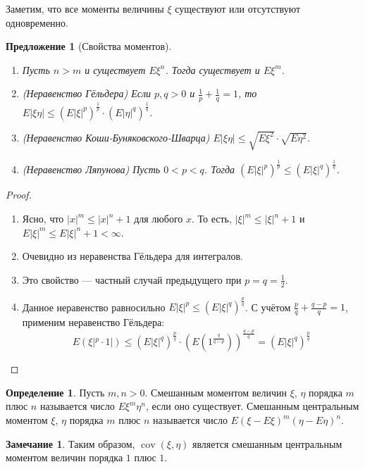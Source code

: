 \documentclass[11pt,openany,a4paper]{scrartcl}
\theoremstyle{plain}
\newtheorem{proposition}[theorem]{Предложение}
\theoremstyle{definition}
\newtheorem{definition}[theorem]{Определение}
\newtheorem{remark}[theorem]{Замечание}
\DeclareMathOperator{\cov}{cov}
\begin{document}
Заметим, что все моменты величины $\xi$ существуют или отсутствуют одновременно.

\begin{proposition}[Свойства моментов]
\mbox{}
    \begin{enumerate}
        \item Пусть $n > m$ и существует $E\xi^n$. Тогда существует и $E\xi^m$.
        \item (Неравенство Гёльдера) Если $p, q > 0$ и
        $\frac{1}{p} + \frac{1}{q} = 1$, то $E|\xi\eta| \leqslant
        (E|\xi|^p)^\frac{1}{p} \cdot (E|\eta|^q)^\frac{1}{q}$.
        \item (Неравенство Коши-Буняковского-Шварца)
        $E|\xi\eta| \leqslant \sqrt{E\xi^2} \cdot \sqrt{E\eta^2}$.
        \item (Неравенство Ляпунова) Пусть $0 < p < q$. Тогда
        $(E|\xi|^p)^\frac{1}{p} \leqslant (E|\xi|^q)^\frac{1}{q}$.
    \end{enumerate}
\end{proposition}
\begin{proof}
    \begin{enumerate}
        \item Ясно, что $|x|^m \leqslant |x|^n + 1$ для любого $x$. То есть,
        $|\xi|^m \leqslant |\xi|^n + 1$ и
        $E|\xi|^m \leqslant E|\xi|^n + 1 < \infty$.
        \item Очевидно из неравенства Гёльдера для интегралов.
        \item Это свойство — частный случай предыдущего при $p = q = \frac{1}{2}$.
        \item Данное неравенство равносильно
        $E|\xi|^p \leqslant (E|\xi|^q)^\frac{p}{q}$. С учётом
        $\frac{p}{q} + \frac{q - p}{q} = 1$, применим неравенство Гёльдера:
        $$
        E(\xi|^p \cdot 1|) \leqslant (E|\xi|^q)^\frac{p}{q}\cdot
        (E (1^\frac{q}{q - p}))^\frac{q - p}{q} = (E|\xi|^q)^\frac{p}{q}
        $$
    \end{enumerate}
\end{proof}

\begin{definition}
    Пусть $m,n > 0$. Смешанным моментом величин $\xi$, $\eta$ порядка $m$ плюс $n$ 
    называется число $E\xi^m\eta^n$, если оно существует. Смешанным центральным 
    моментом $\xi$, $\eta$ порядка $m$ плюс $n$ называется число
    $E(\xi - E\xi)^m(\eta - E\eta)^n$.
\end{definition}
\begin{remark}
    Таким образом, $\cov (\xi, \eta)$ является смешанным центральным моментом
    величин порядка $1$ плюс $1$.
\end{remark}
\end{document}

